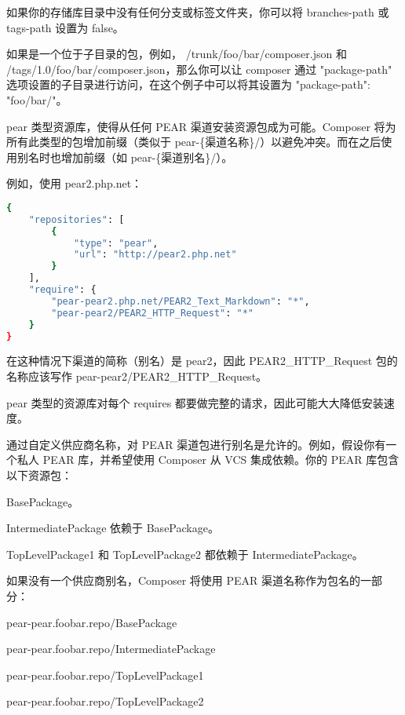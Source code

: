 如果你的存储库目录中没有任何分支或标签文件夹，你可以将 branches-path 或 tags-path 设置为 false。


如果是一个位于子目录的包，例如， /trunk/foo/bar/composer.json 和 /tags/1.0/foo/bar/composer.json，那么你可以让 composer 通过 "package-path" 选项设置的子目录进行访问，在这个例子中可以将其设置为 "package-path": "foo/bar/"。

pear 类型资源库，使得从任何 PEAR 渠道安装资源包成为可能。Composer 将为所有此类型的包增加前缀（类似于 pear-\{渠道名称\}/）以避免冲突。而在之后使用别名时也增加前缀（如 pear-\{渠道别名\}/）。

例如，使用 pear2.php.net：



\begin{lstlisting}[language=bash]
{
    "repositories": [
        {
            "type": "pear",
            "url": "http://pear2.php.net"
        }
    ],
    "require": {
        "pear-pear2.php.net/PEAR2_Text_Markdown": "*",
        "pear-pear2/PEAR2_HTTP_Request": "*"
    }
}
\end{lstlisting}

在这种情况下渠道的简称（别名）是 pear2，因此 PEAR2\_HTTP\_Request 包的名称应该写作 pear-pear2/PEAR2\_HTTP\_Request。

pear 类型的资源库对每个 requires 都要做完整的请求，因此可能大大降低安装速度。

通过自定义供应商名称，对 PEAR 渠道包进行别名是允许的。例如，假设你有一个私人 PEAR 库，并希望使用 Composer 从 VCS 集成依赖。你的 PEAR 库包含以下资源包：

\begin{compactitem}
\item BasePackage。
\item IntermediatePackage 依赖于 BasePackage。
\item TopLevelPackage1 和 TopLevelPackage2 都依赖于 IntermediatePackage。
\end{compactitem}

如果没有一个供应商别名，Composer 将使用 PEAR 渠道名称作为包名的一部分：

\begin{compactitem}
\item pear-pear.foobar.repo/BasePackage
\item pear-pear.foobar.repo/IntermediatePackage
\item pear-pear.foobar.repo/TopLevelPackage1
\item pear-pear.foobar.repo/TopLevelPackage2
\end{compactitem}

